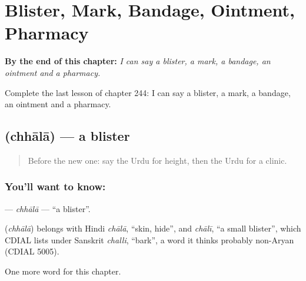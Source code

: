 
\chapter{Blister, Mark, Bandage, Ointment, Pharmacy}
\label{ch:ur-blister-mark-bandage-ointment-pharmacy}

\begin{chapteropening}
\textbf{By the end of this chapter:} \emph{I can say a blister, a mark, a bandage, an ointment and a pharmacy.}

Complete the last lesson of chapter 244: I can say a blister, a mark, a bandage, an ointment and a pharmacy.
\end{chapteropening}

\section[\texorpdfstring{\ur{چھالا} (chhālā)}{چھالا (chhālā)}]{ (chhālā) — a blister}

\label{lesson:UR-C244-chhala}



\begin{quote}
Before the new one: say the Urdu for height, then the Urdu for a clinic.
\end{quote}

\subsection*{You'll want to know: }
\textbf{} — \emph{chhālā} — \textquotedblleft{}a blister\textquotedblright{}.

\begin{cousinweb}
\textbf{} (\emph{chhālā}) belongs with Hindi \emph{chālā}, \textquotedblleft{}skin, hide\textquotedblright{}, and \emph{chālī}, \textquotedblleft{}a small blister\textquotedblright{}, which CDIAL lists under Sanskrit \emph{challi}, \textquotedblleft{}bark\textquotedblright{}, a word it thinks probably non-Aryan (CDIAL 5005).
\end{cousinweb}

\begin{grammarlens}[title={What you've built}]
One more word for this chapter.
\end{grammarlens}


